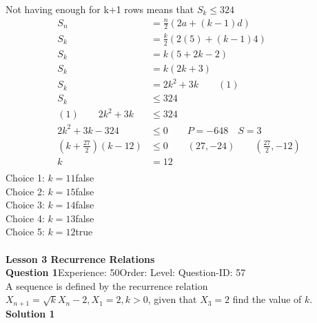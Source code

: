 \documentclass{article}
\begin{document}
Not having enough for k+1 rows means that $S_k\leq324$
\begin{align*}
	S_n&=\displaystyle\frac{n}{2}(2a+(k-1)d)\\[2pt]
	S_k&=\displaystyle\frac{k}{2}(2(5)+(k-1)4)\\[2pt]
	S_k&=k(5+2k-2)\\[2pt]
	S_k&=k(2k+3)\\[2pt]
	S_k&=2k^2+3k \qquad (1)\\[12pt]
	S_k&\leq 324 \\[2pt]
	(1)\qquad 2k^2+3k& \leq 324\\[2pt]
	2k^2+3k-324&\leq 0\qquad P=-648 \quad S=3\\[2pt]
	\left(k+\displaystyle\frac{27}{2}\right)(k-12)&\leq 0 \qquad (27,-24)\qquad \left(\displaystyle\frac{27}{2},-12\right)\\[2pt]
	k&=12\\
\end{align*}
Choice 1: \hspace{20pt}$k=11$\hspace{20pt}false\\
Choice 2: \hspace{20pt}$k=15$\hspace{20pt}false\\
Choice 3: \hspace{20pt}$k=14$\hspace{20pt}false\\
Choice 4: \hspace{20pt}$k=13$\hspace{20pt}false\\
Choice 5: \hspace{20pt}$k=12$\hspace{20pt}true\\
\\[4pt]
\noindent\large{\textbf{Lesson 3 Recurrence Relations}}\\[12pt]
\noindent\textbf{Question 1}\hspace{20pt}Experience: 50\hspace{20pt}Order: \hspace{20pt}Level: \hspace{20pt}Question-ID: 57\\[2pt]
A sequence is defined by the recurrence relation $X_{n+1}=\sqrt{k}X_n-2, X_1=2,k>0$, given that $X_3=2$ find the value of $k$.\\[4pt]
\noindent\textbf{Solution 1}\\[2pt]
\end{document}
